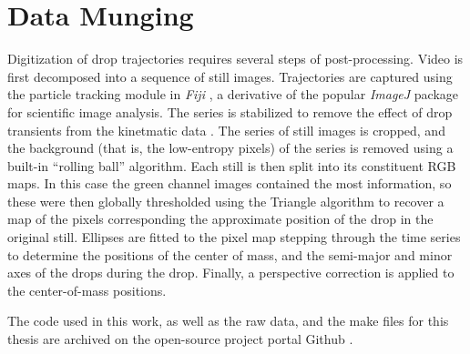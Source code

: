 \documentclass[12pt,a4paper,oneside]{book}
\begin{document}
\section{Data Munging}
Digitization of drop trajectories requires several steps of post-processing. Video is first decomposed into a sequence of still images. Trajectories are captured using the particle tracking module in \emph{Fiji} \cite{schindelin_fiji:_2012}, a derivative of the popular \emph{ImageJ} \cite{schneider_nih_2012} package for scientific image analysis. The series is stabilized to remove the effect of drop transients from the kinetmatic data \cite{li_image_2008}. The series of still images is cropped, and the background (that is, the low-entropy pixels) of the series is removed using a built-in ``rolling ball'' algorithm. Each still is then split into its constituent RGB maps. In this case the green channel images contained the most information, so these were then globally thresholded using the Triangle algorithm to recover a map of the pixels corresponding the approximate position of the drop in the original still. Ellipses are fitted to the pixel map stepping through the time series to determine the positions of the center of mass, and the semi-major and minor axes of the drops during the drop. Finally, a perspective correction is applied to the center-of-mass positions. 

The code used in this work, as well as the raw data, and the make files for this thesis are archived on the open-source project portal Github \cite{schmidt_droplet_electro-bounce:_2017}.
\end{document}
